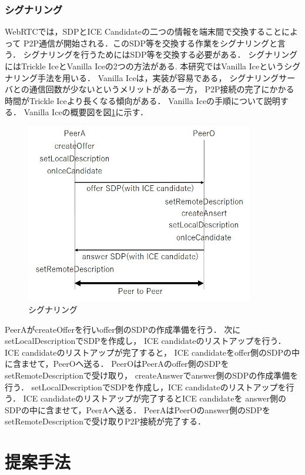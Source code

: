 \documentclass[sotsuron]{jcsie}
\begin{document}
\subsection{シグナリング}
WebRTCでは，SDPとICE Candidateの二つの情報を端末間で交換することによって
P2P通信が開始される．このSDP等を交換する作業をシグナリングと言う．
シグナリングを行うためにはSDP等を交換する必要がある．
シグナリングにはTrickle IceとVanilla Iceの2つの方法がある.
本研究ではVanilla Iceというシグナリング手法を用いる．
Vanilla Iceは，実装が容易である，
シグナリングサーバとの通信回数が少ないというメリットがある一方，
P2P接続の完了にかかる時間がTrickle Iceより長くなる傾向がある．
Vanilla Iceの手順について説明する．
Vanilla Iceの概要図を図\ref{fig:signaling}に示す．
\begin{figure}[H]
	\centering
	\includegraphics[width=10cm]{./assets/image/signaling.png}
	\caption{シグナリング}
	\label{fig:signaling}
\end{figure}
PeerAがcreateOfferを行いoffer側のSDPの作成準備を行う．
次にsetLocalDescriptionでSDPを作成し，
ICE candidateのリストアップを行う．
ICE candidateのリストアップが完了すると，
ICE candidateをoffer側のSDPの中に含ませて，PeerOへ送る．
PeerOはPeerAのoffer側のSDPをsetRemoteDescriptionで受け取り，
createAnswerでanswer側のSDPの作成準備を行う．
setLocalDescriptionでSDPを作成し，ICE candidateのリストアップを行う．
ICE candidateのリストアップが完了するとICE candidateを
answer側のSDPの中に含ませて，PeerAへ送る．
PeerAはPeerOのanswer側のSDPをsetRemoteDescriptionで受け取りP2P接続が完了する．


\chapter{提案手法}
\end{document}
